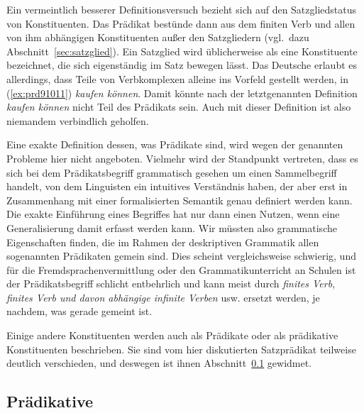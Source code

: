 
\label{abs:satzgliedfail}Ein vermeintlich besserer Definitionsversuch bezieht sich auf den Satzgliedstatus von Konstituenten.
Das Prädikat bestünde dann aus dem finiten Verb und allen von ihm abhängigen Konstituenten außer den Satzgliedern (vgl.\ dazu Abschnitt~\ref{sec:satzglied}).
Ein Satzglied wird üblicherweise als eine Konstituente bezeichnet, die sich eigenständig im Satz bewegen lässt.
Das Deutsche erlaubt es allerdings, dass Teile von Verbkomplexen alleine ins Vorfeld gestellt werden, in (\ref{ex:prd91011}) \zB \textit{kaufen können}.
Damit könnte nach der letztgenannten Definition \textit{kaufen können} nicht Teil des Prädikats sein.
Auch mit dieser Definition ist also niemandem verbindlich geholfen.

\begin{exe}
\end{exe}

Eine exakte Definition dessen, was Prädikate sind, wird wegen der genannten Probleme hier nicht angeboten.
Vielmehr wird der Standpunkt vertreten, dass es sich bei dem Prädikatsbegriff grammatisch gesehen um einen Sammelbegriff handelt, von dem Linguisten ein intuitives Verständnis haben, der aber erst in Zusammenhang mit einer formalisierten Semantik genau definiert werden kann.
Die exakte Einführung eines Begriffes hat nur dann einen Nutzen, wenn eine Generalisierung damit erfasst werden kann.
Wir müssten also grammatische Eigenschaften finden, die im Rahmen der deskriptiven Grammatik allen sogenannten Prädikaten gemein sind.
Dies scheint vergleichsweise schwierig, und für die Fremdsprachenvermittlung oder den Grammatikunterricht an Schulen ist der Prädikatsbegriff schlicht entbehrlich und kann meist durch \textit{finites Verb}, \textit{finites Verb und davon abhängige infinite Verben} usw. ersetzt werden, je nachdem, was gerade gemeint ist.

Einige andere Konstituenten werden auch als Prädikate oder als prädikative Konstituenten beschrieben.
Sie sind vom hier diskutierten Satzprädikat teilweise deutlich verschieden, und deswegen ist ihnen Abschnitt~\ref{sec:praedikative} gewidmet.

\subsection{Prädikative}

\label{sec:praedikative}

